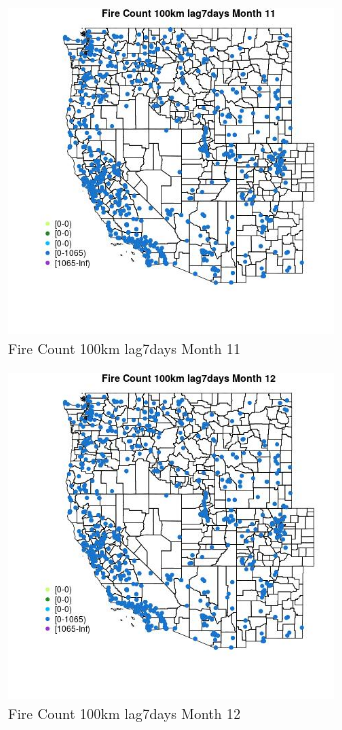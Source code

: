 \begin{figure} 
\centering  
\includegraphics[width=0.77\textwidth]{Code_Outputs/Report_ML_input_PM25_Step4_part_f_de_duplicated_aveswNAs_MapObsMo11Fire_Count_100km_lag7days.jpg} 
\caption{\label{fig:Report_ML_input_PM25_Step4_part_f_de_duplicated_aveswNAsMapObsMo11Fire_Count_100km_lag7days}Fire Count 100km lag7days Month 11} 
\end{figure} 
 

\begin{figure} 
\centering  
\includegraphics[width=0.77\textwidth]{Code_Outputs/Report_ML_input_PM25_Step4_part_f_de_duplicated_aveswNAs_MapObsMo12Fire_Count_100km_lag7days.jpg} 
\caption{\label{fig:Report_ML_input_PM25_Step4_part_f_de_duplicated_aveswNAsMapObsMo12Fire_Count_100km_lag7days}Fire Count 100km lag7days Month 12} 
\end{figure} 
 

